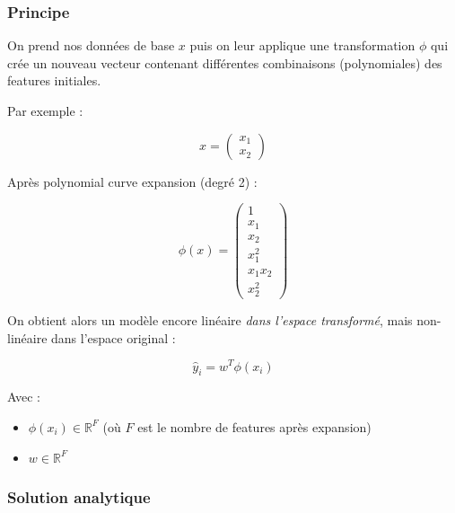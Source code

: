 \documentclass[11pt,a4paper,openany]{book}
\begin{document}
\vspace{0.8cm}

\subsubsection{Principe}

On prend nos données de base $x$ puis on leur applique une transformation $\phi$ qui crée un nouveau vecteur contenant différentes combinaisons (polynomiales) des features initiales.

\vspace{0.5cm}

Par exemple :

\[
x =
\begin{pmatrix}
x_1 \\
x_2
\end{pmatrix}
\]

\vspace{0.4cm}

Après polynomial curve expansion (degré 2) :

\[
\phi(x)
=
\begin{pmatrix}
1 \\
x_1 \\
x_2 \\
x_1^2 \\
x_1 x_2 \\
x_2^2
\end{pmatrix}
\]

\vspace{0.5cm}

On obtient alors un modèle encore linéaire \textit{dans l'espace transformé}, mais non-linéaire dans l'espace original :

\[
\hat{y}_i = w^T \phi(x_i)
\]

\vspace{0.4cm}

Avec :

\begin{itemize}
    \item $\phi(x_i) \in \mathbb{R}^{F}$ (où $F$ est le nombre de features après expansion)
    \item $w \in \mathbb{R}^{F}$
\end{itemize}

\vspace{0.8cm}

\subsubsection{Solution analytique}
\end{document}
